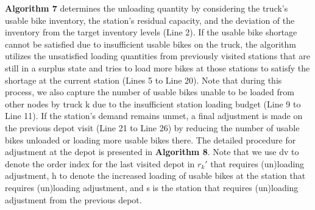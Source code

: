 \textbf{Algorithm 7} determines the unloading quantity by considering the truck's usable bike
inventory, the station's residual capacity, and the deviation of the inventory from the target
inventory levels (Line 2). If the usable bike shortage cannot be satisfied due to insufficient
usable bikes on the truck, the algorithm utilizes the unsatisfied loading quantities from previously
visited stations that are still in a surplus state and tries to load more bikes at those stations to
satisfy the shortage at the current station (Lines 5 to Line 20). Note that during this process, we
also capture the number of usable bikes unable to be loaded from other nodes by truck k due to the
insufficient station loading budget (Line 9 to Line 11). If the station's demand remains unmet, a
final adjustment is made on the previous depot visit (Line 21 to Line 26) by reducing the number of
usable bikes unloaded or loading more usable bikes there. The detailed procedure for adjustment at
the depot is presented in \textbf{Algorithm 8}. Note that we use dv to denote the order index for
the last visited depot in \(r_{k}'\) that requires (un)loading adjustment, h to denote the increased
loading of usable bikes at the station that requires (un)loading adjustment, and s is the station
that requires (un)loading adjustment from the previous depot.

